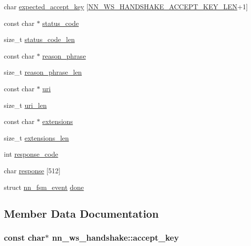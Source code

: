\begin{DoxyCompactItemize}
char \hyperlink{structnn__ws__handshake_a6900b8db78f0e831cc5cbb88cbfa2756}{expected\+\_\+accept\+\_\+key} \mbox{[}\hyperlink{ws__handshake_8h_a0e0823af286def8ab04c551a94cafaf6}{N\+N\+\_\+\+W\+S\+\_\+\+H\+A\+N\+D\+S\+H\+A\+K\+E\+\_\+\+A\+C\+C\+E\+P\+T\+\_\+\+K\+E\+Y\+\_\+\+L\+EN}+1\mbox{]}
\item 
const char $\ast$ \hyperlink{structnn__ws__handshake_af78bc2f401a7685aa775c418cc02caea}{status\+\_\+code}
\item 
size\+\_\+t \hyperlink{structnn__ws__handshake_a3f3ce6da3070b1fd8257c097ced20ee7}{status\+\_\+code\+\_\+len}
\item 
const char $\ast$ \hyperlink{structnn__ws__handshake_a5767b466d666d242eaf8867ba643ead6}{reason\+\_\+phrase}
\item 
size\+\_\+t \hyperlink{structnn__ws__handshake_a380f0a37eb17376ef276eb81f8d9078b}{reason\+\_\+phrase\+\_\+len}
\item 
const char $\ast$ \hyperlink{structnn__ws__handshake_a740db748995241b2322b3e3fba7d413f}{uri}
\item 
size\+\_\+t \hyperlink{structnn__ws__handshake_aadf45c47c57915ff53b8465f9548ef7a}{uri\+\_\+len}
\item 
const char $\ast$ \hyperlink{structnn__ws__handshake_a06b381413703475f05d6007c12572005}{extensions}
\item 
size\+\_\+t \hyperlink{structnn__ws__handshake_a728de6886e84d680f7b461a1a9811e87}{extensions\+\_\+len}
\item 
int \hyperlink{structnn__ws__handshake_a927e74042f958433c47490c7e3aa18dc}{response\+\_\+code}
\item 
char \hyperlink{structnn__ws__handshake_a4ccc152559b66bb3be8c631c1d8d50ae}{response} \mbox{[}512\mbox{]}
\item 
struct \hyperlink{structnn__fsm__event}{nn\+\_\+fsm\+\_\+event} \hyperlink{structnn__ws__handshake_a29e3a8e55ea0e660734b1e242d1e6e1f}{done}
\end{DoxyCompactItemize}


\subsection{Member Data Documentation}
\subsubsection[{accept\+\_\+key}]{\setlength{\rightskip}{0pt plus 5cm}const char$\ast$ nn\+\_\+ws\+\_\+handshake\+::accept\+\_\+key}\hypertarget{structnn__ws__handshake_a232c6eea32e0d68c40af288537aa71f8}{}\label{structnn__ws__handshake_a232c6eea32e0d68c40af288537aa71f8}
